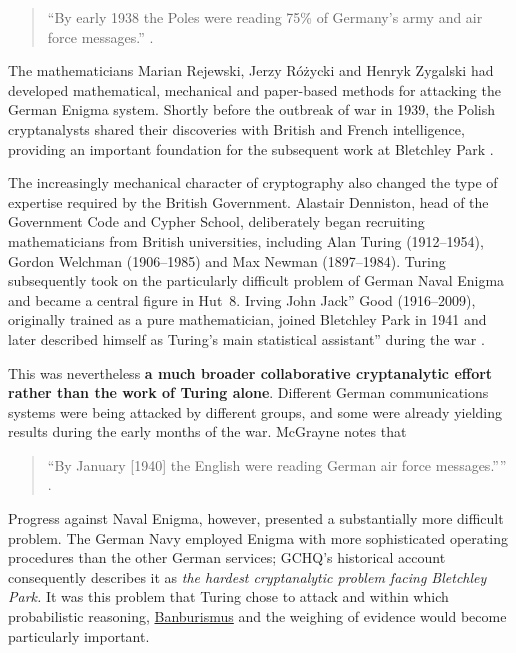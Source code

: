 \begin{quote}
“By early 1938 the Poles were reading 75\% of Germany’s army and air force messages.”
\cite{mcgrayne2011}.
\end{quote}

The mathematicians Marian Rejewski, Jerzy Różycki and Henryk Zygalski had developed mathematical, mechanical and paper-based methods for attacking the German Enigma system. Shortly before the outbreak of war in 1939, the Polish cryptanalysts shared their discoveries with British and French intelligence, providing an important foundation for the subsequent work at Bletchley Park \cite{mcgrayne2011,hodges2014,hinsley1993}.

The increasingly mechanical character of cryptography also changed the type of expertise required by the British Government. Alastair Denniston, head of the Government Code and Cypher School, deliberately began recruiting mathematicians from British universities, including Alan Turing (1912--1954), Gordon Welchman (1906--1985) and Max Newman (1897--1984). Turing subsequently took on the particularly difficult problem of German Naval Enigma and became a central figure in Hut~8. Irving John Jack'' Good (1916--2009), originally trained as a pure mathematician, joined Bletchley Park in 1941 and later described himself as Turing's main statistical assistant'' during the war \cite{good1979turing}.

This was nevertheless\textbf{ a much broader collaborative cryptanalytic effort rather than the work of Turing alone}. Different German communications systems were being attacked by different groups, and some were already yielding results during the early months of the war. McGrayne notes that

\begin{quote}
“By January [1940] the English were reading German air force messages.””
\cite{mcgrayne2011}.
\end{quote}

Progress against Naval Enigma, however, presented a substantially more difficult problem. The German Navy employed Enigma with more sophisticated operating procedures than the other German services; GCHQ's historical account consequently describes it as \textit{the hardest cryptanalytic problem facing Bletchley Park.} It was this problem that Turing chose to attack and within which probabilistic reasoning, \href{https://en.wikipedia.org/wiki/Banburismus}{Banburismus} and the weighing of evidence would become particularly important.


